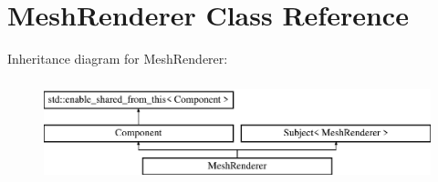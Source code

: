 \hypertarget{class_mesh_renderer}{}\section{Mesh\+Renderer Class Reference}
\label{class_mesh_renderer}
Inheritance diagram for Mesh\+Renderer\+:\begin{figure}[H]
\begin{center}
\leavevmode
\includegraphics[height=3.000000cm]{class_mesh_renderer}
\end{center}
\end{figure}
